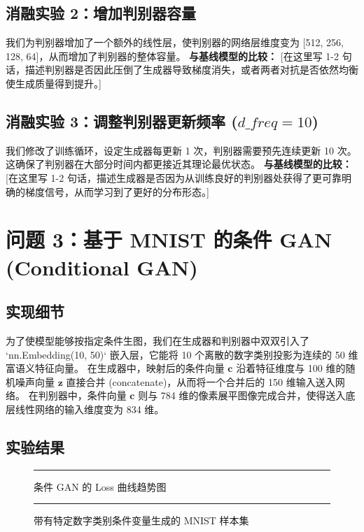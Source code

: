 \documentclass[11pt,UTF8]{ctexart}
\begin{document}
\subsection*{消融实验 2：增加判别器容量}
我们为判别器增加了一个额外的线性层，使判别器的网络层维度变为 [512, 256, 128, 64]，从而增加了判别器的整体容量。
\textbf{与基线模型的比较：} [在这里写 1-2 句话，描述判别器是否因此压倒了生成器导致梯度消失，或者两者对抗是否依然均衡使生成质量得到提升。]

\subsection*{消融实验 3：调整判别器更新频率 ($d\_freq = 10$)}
我们修改了训练循环，设定生成器每更新 1 次，判别器需要预先连续更新 10 次。这确保了判别器在大部分时间内都更接近其理论最优状态。
\textbf{与基线模型的比较：} [在这里写 1-2 句话，描述生成器是否因为从训练良好的判别器处获得了更可靠明确的梯度信号，从而学习到了更好的分布形态。]


\section*{问题 3：基于 MNIST 的条件 GAN (Conditional GAN)}
\subsection*{实现细节}
为了使模型能够按指定条件生图，我们在生成器和判别器中双双引入了 `nn.Embedding(10, 50)` 嵌入层，它能将 10 个离散的数字类别投影为连续的 50 维富语义特征向量。
在生成器中，映射后的条件向量 $\mathbf{c}$ 沿着特征维度与 100 维的随机噪声向量 $\mathbf{z}$ 直接合并 (concatenate)，从而将一个合并后的 150 维输入送入网络。
在判别器中，条件向量 $\mathbf{c}$ 则与 784 维的像素展平图像完成合并，使得送入底层线性网络的输入维度变为 834 维。

\subsection*{实验结果}
\begin{figure}[H]
    \centering
    \rule{10cm}{5cm} %
    \caption{条件 GAN 的 Loss 曲线趋势图}
\end{figure}
\begin{figure}[H]
    \centering
    \rule{10cm}{5cm} %
    \caption{带有特定数字类别条件变量生成的 MNIST 样本集}
\end{figure}
\end{document}
